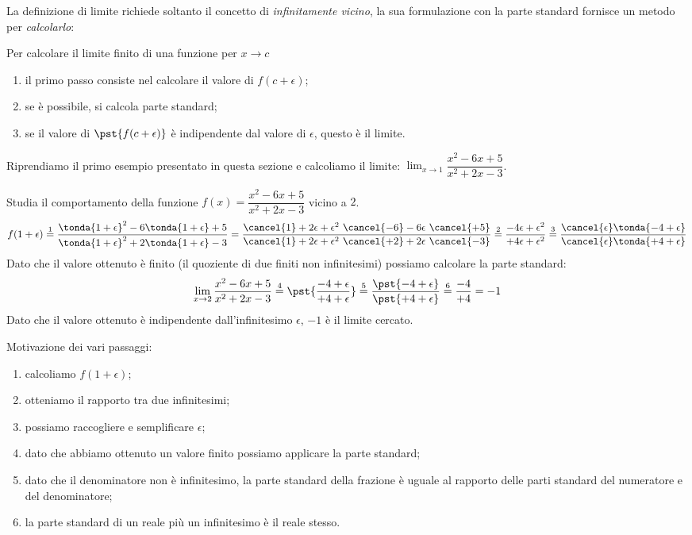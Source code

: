 La definizione di limite richiede soltanto il concetto di 
\emph{infinitamente vicino}, la sua formulazione con la parte standard 
fornisce un metodo per \emph{calcolarlo}:

\begin{procedura}
Per calcolare il limite finito di una funzione per \(x \to c\)

\begin{enumerate} [noitemsep]
\item il primo passo consiste nel calcolare il valore di 
\(f(c+\epsilon)\);
\item se è possibile, si calcola parte standard;
\item se il valore di \(\pst{f(c+\epsilon)}\) è indipendente dal valore di
\(\epsilon\), questo è il limite.
\end{enumerate}
\end{procedura}


\begin{esempio}
Riprendiamo il primo esempio presentato in questa sezione e calcoliamo il 
limite: \(\displaystyle \lim_{x \to 1}\dfrac{x^2-6x+5}{x^2+2x-3}\).

Studia il comportamento della funzione 
\(f(x) = \dfrac{x^2-6x+5}{x^2+2x-3}\)
vicino a \(2\). 
\[
f(1 + \epsilon) \stackrel{1}{=}
  \dfrac{\tonda{1+\epsilon}^2-6\tonda{1+\epsilon}+5}
        {\tonda{1+\epsilon}^2+2\tonda{1+\epsilon}-3} =
  \dfrac{\cancel{1}+2\epsilon+\epsilon^2~
            \cancel{-6}-6\epsilon~\cancel{+5}}
        {\cancel{1}+2\epsilon+\epsilon^2~
            \cancel{+2}+2\epsilon~\cancel{-3}}
\stackrel{2}{=}
  \dfrac{-4\epsilon+\epsilon^2}
        {+4\epsilon+\epsilon^2}
\stackrel{3}{=}
  \dfrac{\cancel{\epsilon}\tonda{-4+\epsilon}}
        {\cancel{\epsilon}\tonda{+4+\epsilon}}
\]
Dato che il valore ottenuto è finito 
(il quoziente di due finiti non infinitesimi) 
possiamo calcolare la parte standard:
\[
\lim_{x \to 2} \frac{x^2-6x+5}{x^2+2x-3} \stackrel{4}{=} 
\pst{\frac{-4+\epsilon} {+4+\epsilon}} \stackrel{5}{=}
\frac{\pst{-4+\epsilon}}{\pst{+4+\epsilon}} \stackrel{6}{=} 
\frac{-4}{+4} = -1
\]
Dato che il valore ottenuto è indipendente dall'infinitesimo \(\epsilon\), 
\(-1\) è il limite cercato.

Motivazione dei vari passaggi:
\begin{enumerate} [nosep]
\item calcoliamo \(f(1+\epsilon)\);
\item otteniamo il rapporto tra due infinitesimi;
\item possiamo raccogliere e semplificare \(\epsilon\);
\item dato che abbiamo ottenuto un valore finito possiamo applicare la parte 
standard;
\item dato che il denominatore non è infinitesimo, la parte standard della 
frazione è uguale al rapporto delle parti standard del numeratore e del 
denominatore;
\item la parte standard di un reale più un infinitesimo è il reale stesso.
\end{enumerate}
\end{esempio}

